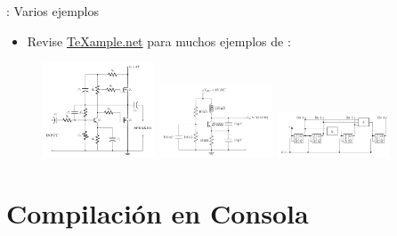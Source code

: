 \documentclass{beamer}
\begin{document}
\begin{frame}[fragile]{\insertsection: Varios ejemplos}
  \begin{itemize}
  \item Revise
    \href{http://texample.net}{\TeX{}ample.net} para
    muchos ejemplos de :
  \end{itemize}
  \begin{figure}
    \href{http://texample.net/tikz/examples/mosfet/}{%
      \includegraphics[width=0.3\textwidth]{mosfet}}
    \href{http://texample.net/tikz/examples/collpits/}{%
      \includegraphics[width=0.3\textwidth]{collpits}}
    \href{http://texample.net/tikz/examples/4-bit-counter/}{%
      \includegraphics[width=0.3\textwidth]{4-bit-counter}}
  \end{figure}
\end{frame}

\section{Compilación en Consola}
\end{document}
